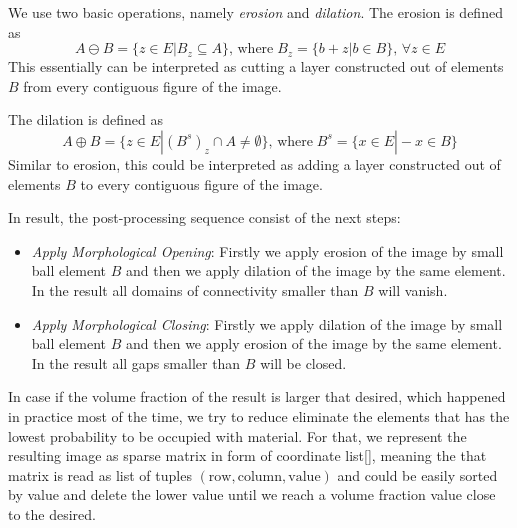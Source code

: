 We use two basic operations, namely \textit{erosion} and \textit{dilation}.
The erosion is defined as 
\begin{equation}
A \ominus B = \{z \in E | B_{z} \subseteq A \}, \, \mathrm{where} \; B_{z}=\{ b+z | b \in B \}, \, \forall z \in E 
\end{equation} 
This essentially can be interpreted as cutting a layer constructed out of elements $B$ from every contiguous figure of the image.

The dilation is defined as 
\begin{equation}
A \oplus B = \{z \in E | (B^{s})_{z} \cap  A \neq \emptyset \}, \, \mathrm{where} \; B^{s}=\{x \in E | -x \in B \}
\end{equation} 
Similar to erosion, this could be interpreted as adding a layer constructed out of elements $B$ to every contiguous figure of the image. 
\medskip

In result, the post-processing sequence consist of the next steps:
\begin{itemize}
	\item \textit{Apply Morphological Opening}: Firstly we apply erosion of the image by small ball element $B$ and then we apply dilation of the image by the same element. In the result all domains of connectivity smaller than $B$ will vanish.
	\item \textit{Apply Morphological Closing}: Firstly we apply dilation of the image by small ball element $B$ and then we apply erosion of the image by the same element. In the result all gaps smaller than $B$ will be closed.
\end{itemize}

In case if the volume fraction of the result is larger that desired, which happened in practice most of the time, we try to reduce eliminate the elements that has the lowest probability to be occupied with material.
For that, we represent the resulting image as sparse matrix in form of coordinate list\ref{}, meaning the that matrix is read as list of tuples $(\mathrm{row},\mathrm{column},\mathrm{value})$ and could be easily sorted by value and delete the lower value until we reach a volume fraction value close to the desired.



 